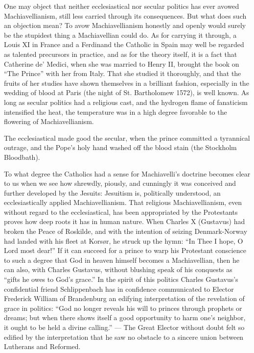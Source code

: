 \documentclass[12pt,a4paper,openany]{book}
\newcommand{\opage}[1]{\marginnote{\footnotesize\textit{[#1]}}}
\begin{document}
One may object that neither ecclesiastical nor
secular politics has ever avowed
Machiavellianism, still less carried through its consequences.
But what does such an objection mean? To
avow Machiavellianism honestly and openly would
surely be the stupidest thing a Machiavellian could do.
As for carrying it through, a Louis XI in
France and a Ferdinand the Catholic in Spain
may well be regarded as talented precursors in practice,
and as for the theory itself, it is a fact
that Catherine de' Medici, when she was married
to Henry II, brought the book on ``The Prince''
with her from Italy. That she studied it
thoroughly, and that the fruits of her studies have shown themselves in
a brilliant fashion, especially in
the wedding of blood at Paris (the night of St. Bartholomew 1572), is
well known. As long as secular politics had a
religious cast, and the hydrogen flame of fanaticism intensified
the heat, the temperature was in a high degree favorable to
the flowering of Machiavellianism.

\setcounter{footnote}{0}%
\opage{96}The ecclesiastical made good the secular, when the prince
committed a tyrannical outrage, and the Pope's holy
hand washed off the blood stain (the Stockholm Bloodbath).

To what degree the Catholics had a sense for
Machiavelli's doctrine becomes clear to us when we see how
shrewdly, piously, and cunningly it was conceived and
further developed by the Jesuits: Jesuitism is, politically
understood, an ecclesiastically applied Machiavellianism. That
religious Machiavellianism, even without regard to
the ecclesiastical, has been appropriated by the Protestants proves
how deep roots it has in human
nature. When Charles X (Gustavus) had broken the Peace of Roskilde,
and with the intention of seizing Denmark-Norway
had landed with his fleet at Korsør, he struck up
the hymn: ``In Thee I hope, O Lord most dear!'' If
it can succeed for a prince to warp his Protestant conscience
to such a degree that God in heaven himself becomes
a Machiavellian, then he can also, with Charles Gustavus,
without blushing speak of his conquests as ``gifts he
owes to God's grace.'' In the spirit of this politics Charles
Gustavus's confidential friend Schlippenbach has in confidence
communicated to Elector Frederick William of Brandenburg an
edifying interpretation of the revelation of grace in politics:
``God no longer reveals his will to princes
through prophets or dreams; but when there
shows itself a good opportunity to harm one's neighbor, it ought
to be held a divine calling.'' --- The Great
Elector without doubt felt so edified by the
interpretation that he saw no obstacle
to a sincere union between Lutherans and Reformed.
\end{document}
